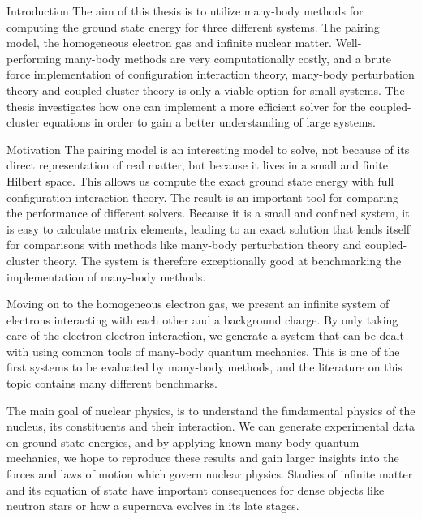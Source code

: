 \documentclass[twoside,english]{uiofysmaster}
\begin{document}
\begin{chapter}{Introduction}
	The aim of this thesis is to utilize many-body methods for
        computing the ground state energy for three different
        systems. The pairing model, the homogeneous electron gas and
        infinite nuclear matter. Well-performing many-body methods
        are very computationally costly, and a brute force
        implementation of configuration interaction theory, many-body perturbation
        theory and coupled-cluster theory is only a viable
        option for small systems. The thesis investigates how one can
        implement a more efficient solver for the coupled-cluster
         equations in order to gain a better  understanding of large systems.

	\begin{subsection}{Motivation}
		The pairing model is an interesting model to solve,
                not because of its direct representation of real
                matter, but because it lives in a small and finite
                Hilbert space. This allows us compute the exact ground
                state energy with full configuration interaction
                theory. The result is an important tool for comparing
                the performance of different solvers. Because it is a
                small and confined system, it is easy to calculate
                matrix elements, leading to an exact solution that
                lends itself for comparisons with methods like
                many-body perturbation theory and coupled-cluster
                theory. The system is therefore exceptionally good at
                benchmarking the implementation of many-body methods.

		Moving on to the homogeneous electron gas, we present
                an infinite system of electrons interacting with each
                other and a background charge. By only taking care of
                the electron-electron interaction, we generate a system
                that can be dealt with using common tools of many-body
                quantum mechanics. This is one of the first systems to
                be evaluated by many-body methods, and the literature
                on this topic contains many different benchmarks.


		The main goal of nuclear physics, is to understand the
                fundamental physics of the nucleus, its constituents
                and their interaction. We can generate experimental
                data on ground state energies, and by applying
                known many-body quantum mechanics, we hope to
                reproduce these results and gain larger insights into
                the forces and laws of motion which govern nuclear physics. 
                Studies of infinite matter and its equation of state have important consequences for 
dense objects like neutron stars or how a supernova evolves in its late stages.


\end{subsection}
\end{chapter}
\end{document}
